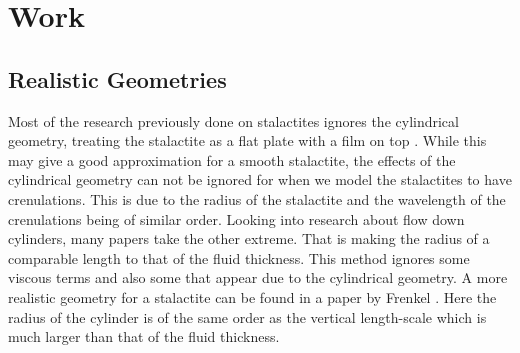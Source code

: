 \documentclass[12pt]{article}
\begin{document}
\section{Work}
\subsection{Realistic Geometries}
Most of the research previously done on stalactites ignores the cylindrical geometry, treating the stalactite as a flat plate with a film on top \cite{short,camporeale_2017,doi:10.1098/rspa.2015.0031}. While this may give a good approximation for a smooth stalactite, the effects of the cylindrical geometry can not be ignored for when we model the stalactites to have crenulations. This is due to the radius of the stalactite and the wavelength of the crenulations being of similar order. Looking into research about flow down cylinders, many papers take the other extreme. That is making the radius of a comparable length to that of the fluid thickness\cite{ CRASTER_2006}. This method ignores some viscous terms and also some that appear due to the cylindrical geometry. A more realistic geometry for a stalactite can be found in a paper by Frenkel \cite{Frenkel_1992}. Here the radius of the cylinder is of the same order as the vertical length-scale which is much larger than that of the fluid thickness.
\end{document}
